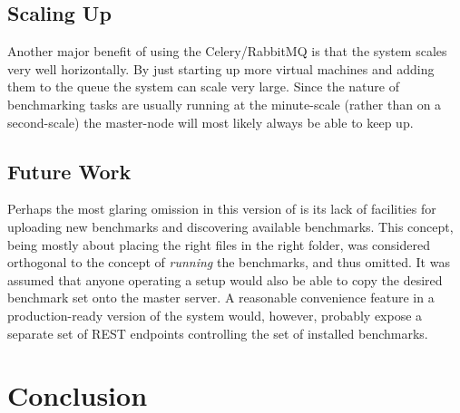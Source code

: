 \documentclass[a4paper]{IEEEtran}
\begin{document}
\subsection{Scaling Up}
Another major benefit of using the Celery/RabbitMQ is that the system
scales very well horizontally. By just starting up more virtual
machines and adding them to the queue the system can scale very
large. Since the nature of benchmarking tasks are usually running at
the minute-scale (rather than on a second-scale) the master-node will
most likely always be able to keep up.


\subsection{Future Work}

Perhaps the most glaring omission in this version of \testbench{} is its lack of
facilities for uploading new benchmarks and discovering available benchmarks.
This concept, being mostly about placing the right files in the right folder,
was considered orthogonal to the concept of \emph{running} the benchmarks, and
thus omitted. It was assumed that anyone operating a \testbench{} setup would
also be able to copy the desired benchmark set onto the master server. A
reasonable convenience feature in a production-ready version of the system
would, however, probably expose a separate set of REST endpoints controlling the
set of installed benchmarks.

% 

\section{Conclusion}

\fixme{\lipsum[100]}

\printbibliography
\end{document}
